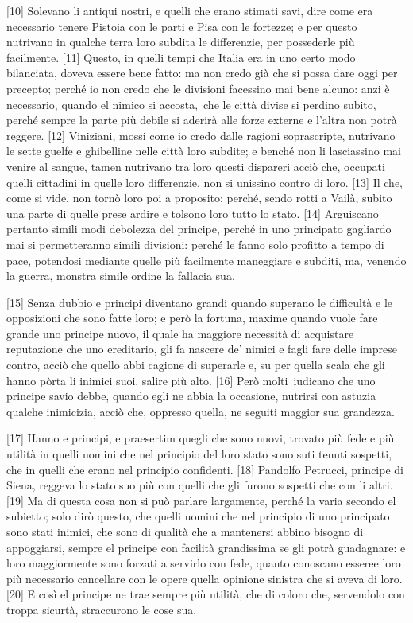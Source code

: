 {[}10{]} Solevano li antiqui nostri, e quelli che erano stimati savi,
dire come era necessario tenere Pistoia con le parti e Pisa con le
fortezze; e per questo nutrivano in qualche terra loro subdita le
differenzie, per possederle più facilmente. {[}11{]} Questo, in quelli
tempi che Italia era in uno certo modo bilanciata, doveva essere bene
fatto: ma non credo già che si possa dare oggi per precepto; perché io
non credo che le divisioni facessino mai bene alcuno: anzi è necessario,
quando el nimico si accosta,\est\ che le città divise si perdino subito,
perché sempre la parte più debile si aderirà alle forze externe e
l'altra non potrà reggere.
{[}12{]} Viniziani, mossi come io credo dalle ragioni soprascripte,
nutrivano le sette guelfe e ghibelline nelle città loro subdite; e
benché non li lasciassino mai venire al sangue, tamen nutrivano tra loro
questi dispareri acciò che, occupati quelli cittadini in quelle loro
differenzie, non si unissino contro di loro. {[}13{]} Il che, come si
vide, non tornò loro poi a proposito: perché, sendo rotti a Vailà,
subito una parte di quelle prese ardire e tolsono loro tutto lo stato.
{[}14{]} Arguiscano pertanto simili modi debolezza del principe, perché
in uno principato gagliardo mai si permetteranno simili divisioni:
perché le fanno solo profitto a tempo di pace, potendosi mediante quelle
più facilmente maneggiare e subditi, ma, venendo la guerra, monstra
simile ordine la fallacia sua.

{[}15{]} Senza dubbio e principi diventano grandi quando superano le
difficultà e le opposizioni che sono fatte loro; e però la fortuna,
maxime quando vuole fare grande uno principe nuovo, il quale ha maggiore
necessità di acquistare reputazione che uno ereditario, gli fa nascere
de' nimici e fagli fare delle imprese contro, acciò che quello abbi
cagione di superarle e, su per quella scala che gli hanno pòrta li
inimici suoi, salire più alto. {[}16{]} Però molti\est\ iudicano che uno
principe savio debbe, quando egli ne abbia la occasione, nutrirsi con
astuzia qualche inimicizia, acciò che, oppresso quella, ne seguiti
maggior sua grandezza.

{[}17{]} Hanno e principi, e praesertim quegli che sono nuovi, trovato
più fede e più utilità in quelli uomini che nel principio del loro stato
sono suti tenuti sospetti, che in quelli che erano nel principio
confidenti. {[}18{]} Pandolfo Petrucci, principe di Siena, reggeva lo
stato suo più con quelli che gli furono sospetti che con li altri.
{[}19{]} Ma di questa cosa non si può parlare largamente, perché la
varia secondo el subietto; solo dirò questo, che quelli uomini che nel
principio di uno principato sono stati inimici, che sono di qualità che
a mantenersi abbino bisogno di appoggiarsi, sempre el principe con
facilità grandissima se gli potrà guadagnare: e loro maggiormente sono
forzati a servirlo con fede, quanto conoscano esseree loro più
necessario cancellare con le opere quella opinione sinistra che si aveva
di loro. {[}20{]} E così el principe ne trae sempre più utilità, che di
coloro che, servendolo con troppa sicurtà, straccurono le cose sua.

